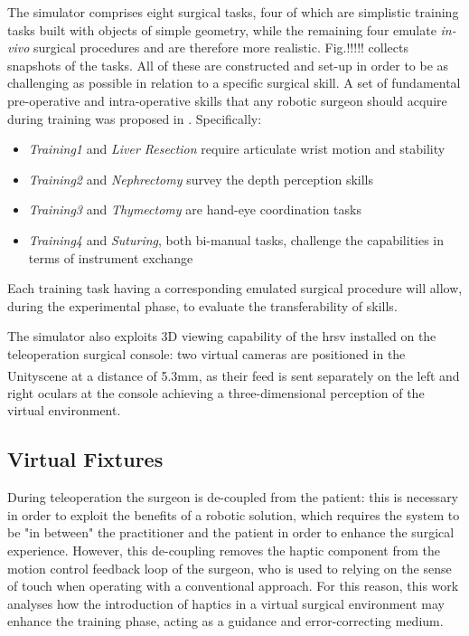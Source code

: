 \documentclass{article}
\newcommand{\cright}{\textsuperscript{\textregistered}\phantom{..}}
\begin{document}
\begin{multicols}{2}
The simulator comprises eight surgical tasks, four of which are simplistic training tasks built with objects of simple geometry, while the remaining four emulate \textit{in-vivo} surgical procedures and are therefore more realistic. Fig.!!!!! collects snapshots of the tasks. All of these are constructed and set-up in order to be as challenging as possible in relation to a specific surgical skill. A set of fundamental pre-operative and intra-operative skills that any robotic surgeon should acquire during training was proposed in \cite{Smith2014}. Specifically:
\begin{itemize}
  \item \textit{Training1} and \textit{Liver Resection} require articulate wrist motion and stability
  \item \textit{Training2} and \textit{Nephrectomy} survey the depth perception skills
  \item \textit{Training3} and \textit{Thymectomy} are hand-eye coordination tasks
  \item \textit{Training4} and \textit{Suturing}, both bi-manual tasks, challenge the capabilities in terms of instrument exchange 
\end{itemize}
Each training task having a corresponding emulated surgical procedure will allow, during the experimental phase, to evaluate the transferability of skills.

The simulator also exploits 3D viewing capability of the \ac{hrsv} installed on the teleoperation surgical console: two virtual cameras are positioned in the Unity\cright scene at a distance of 5.3mm, as their feed is sent separately on the left and right oculars at the console achieving a three-dimensional perception of the virtual environment.
\subsection{Virtual Fixtures}
During teleoperation the surgeon is de-coupled from the patient: this is necessary in order to exploit the benefits of a robotic solution, which requires the system to be "in between" the practitioner and the patient in order to enhance the surgical experience. However, this de-coupling removes the haptic component from the motion control feedback loop of the surgeon, who is used to relying on the sense of touch when operating with a conventional approach. For this reason, this work analyses how the introduction of haptics in a virtual surgical environment may enhance the training phase, acting as a guidance and error-correcting medium. 


\end{multicols}
\end{document}
